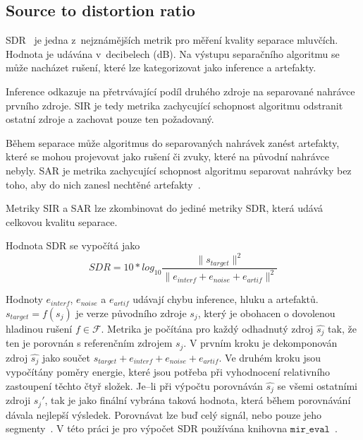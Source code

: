 \subsection{Source to distortion ratio}
SDR~\cite{vincent-inria-00544230} je jedna z~nejznámějších metrik pro měření kvality separace mluvčích. Hodnota je udávána v~decibelech (dB). Na výstupu separačního algoritmu se může nacházet rušení, které lze kategorizovat jako inference a artefakty. 

Inference odkazuje na přetrvávající podíl druhého zdroje na separované nahrávce prvního zdroje. SIR je tedy metrika zachycující schopnost algoritmu odstranit ostatní zdroje a zachovat pouze ten požadovaný.

Během separace může algoritmus do separovaných nahrávek zanést artefakty, které se mohou projevovat jako rušení či zvuky, které na původní nahrávce nebyly. SAR je metrika zachycující schopnost algoritmu separovat nahrávky bez toho, aby do nich zanesl nechtěné artefakty~\cite{venkataramani2018performance}.

Metriky SIR a SAR lze zkombinovat do jediné metriky SDR, která udává celkovou kvalitu separace. 

Hodnota SDR se vypočítá jako 
\begin{equation}
  SDR = 10*log_{10}\frac{\|s_{target}\|^2}{\|e_{interf} + e_{noise} + e_{artif}\|^2}
\end{equation}

Hodnoty $e_{interf}$, $e_{noise}$ a $e_{artif}$ udávají chybu inference, hluku a artefaktů. $s_{target} = f(s_j)$ je verze původního zdroje $s_j$, který je obohacen o dovolenou hladinou rušení $f \in \mathcal{F}$. Metrika je počítána pro každý odhadnutý zdroj $\hat{s_j}$ tak, že ten je porovnán s referenčním zdrojem $s_j$. V prvním kroku je dekomponován zdroj $\hat{s_j}$ jako součet $s_{target} + e_{interf} + e_{noise} + e_{artif}$. Ve druhém kroku jsou vypočítány poměry energie, které jsou potřeba při vyhodnocení relativního zastoupení těchto čtyř složek. Je--li při výpočtu porovnáván $\hat{s_j}$ se všemi ostatními zdroji $s_j'$, tak je jako finální vybrána taková hodnota, která během porovnávání dávala nejlepší výsledek. Porovnávat lze buď celý signál, nebo pouze jeho segmenty~\cite{vincent-inria-00544230}. V této práci je pro výpočet SDR používána knihovna $\texttt{mir\_eval}$~\cite{mir-eval}.





